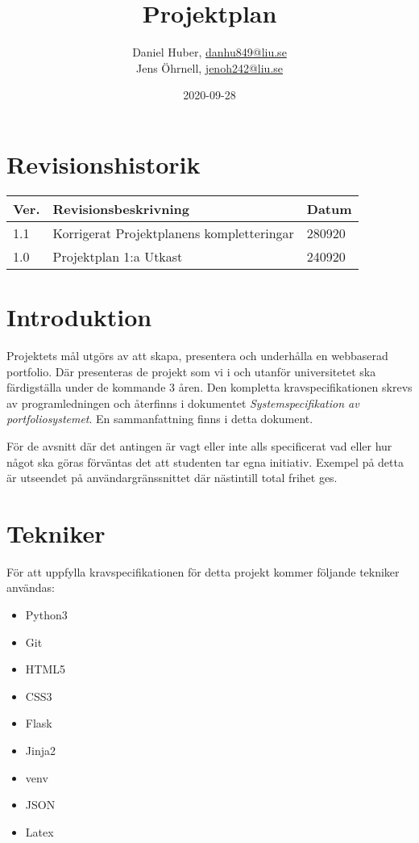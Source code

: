 \documentclass{TDP003mall}
\author{Daniel Huber, \url{danhu849@liu.se}\\
	Jens Öhrnell, \url{jenoh242@liu.se}}
\title{Projektplan}
\date{2020-09-28}
\begin{document}
\projectpage

\tableofcontents

\newpage
\section{Revisionshistorik}
\begin{table}[!h]
\begin{tabularx}{\linewidth}{|l|X|l|}
\hline
  Ver. & Revisionsbeskrivning & Datum \\\hline
  1.1 & Korrigerat Projektplanens kompletteringar & 280920 \\\hline
  1.0 & Projektplan 1:a Utkast & 240920 \\\hline
\end{tabularx}
\end{table}


\section{Introduktion}
Projektets mål utgörs av att skapa, presentera och underhålla en webbaserad portfolio. Där presenteras de projekt som vi i och utanför universitetet ska färdigställa under de kommande 3 åren. Den kompletta kravspecifikationen skrevs av programledningen och återfinns i dokumentet \textit{Systemspecifikation av portfoliosystemet}. En sammanfattning finns i detta dokument.

För de avsnitt där det antingen är vagt eller inte alls specificerat vad eller hur något ska göras förväntas det att studenten tar egna initiativ. Exempel på detta är utseendet på användargränssnittet där nästintill total frihet ges.

\section{Tekniker}
För att uppfylla kravspecifikationen för detta projekt kommer följande tekniker användas:
\begin{itemize}
\item Python3
\item Git
\item HTML5
\item CSS3
\item Flask
\item Jinja2
\item venv
\item JSON
\item Latex
\end{itemize}
\end{document}
